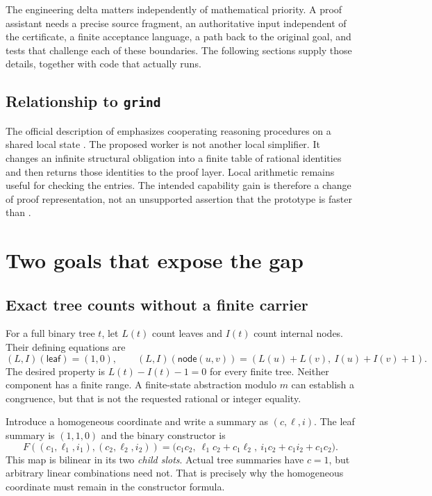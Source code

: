 \documentclass[11pt,letterpaper]{article}
\theoremstyle{definition}\newtheorem{definition}[theorem]{Definition}
\theoremstyle{remark}\newtheorem{remark}[theorem]{Remark}
\newcommand{\code}[1]{\texttt{\detokenize{#1}}}
\begin{document}
The engineering delta matters independently of mathematical priority. A proof assistant needs a precise source fragment, an authoritative input independent of the certificate, a finite acceptance language, a path back to the original goal, and tests that challenge each of these boundaries. The following sections supply those details, together with code that actually runs.

\subsection{Relationship to \texttt{grind}}
The official description of \code{grind} emphasizes cooperating reasoning procedures on a shared local state \cite{grind}. The proposed worker is not another local simplifier. It changes an infinite structural obligation into a finite table of rational identities and then returns those identities to the proof layer. Local arithmetic remains useful for checking the entries. The intended capability gain is therefore a change of proof representation, not an unsupported assertion that the prototype is faster than \code{grind}.

\section{Two goals that expose the gap}
\label{sec:goals}

\subsection{Exact tree counts without a finite carrier}
For a full binary tree $t$, let $L(t)$ count leaves and $I(t)$ count internal nodes. Their defining equations are
\[
 (L,I)(\mathsf{leaf})=(1,0),\qquad
 (L,I)(\mathsf{node}(u,v))=(L(u)+L(v),\ I(u)+I(v)+1).
\]
The desired property is $L(t)-I(t)-1=0$ for every finite tree. Neither component has a finite range. A finite-state abstraction modulo $m$ can establish a congruence, but that is not the requested rational or integer equality.

Introduce a homogeneous coordinate and write a summary as $(c,\ell,i)$. The leaf summary is $(1,1,0)$ and the binary constructor is
\begin{equation}\label{eq:count-constructor}
 F((c_1,\ell_1,i_1),(c_2,\ell_2,i_2))
 =\bigl(c_1c_2,\ \ell_1c_2+c_1\ell_2,\ i_1c_2+c_1i_2+c_1c_2\bigr).
\end{equation}
This map is bilinear in its two \emph{child slots}. Actual tree summaries have $c=1$, but arbitrary linear combinations need not. That is precisely why the homogeneous coordinate must remain in the constructor formula.
\end{document}
